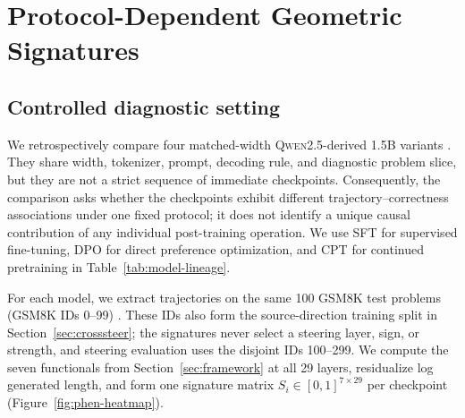 \section{Protocol-Dependent Geometric Signatures}
\label{sec:phenomenon}

\subsection{Controlled diagnostic setting}
\label{sec:phenomenon-setting}

We retrospectively compare four matched-width \textsc{Qwen2.5}-derived 1.5B variants
\citep{qwen25-2024,qwen25-math-2024,deepseek-r1-2025}.  They share width,
tokenizer, prompt, decoding rule, and diagnostic problem slice, but they are not
a strict sequence of immediate checkpoints.  Consequently, the comparison asks
whether the checkpoints exhibit different trajectory--correctness associations
under one fixed protocol; it does not identify a unique causal contribution of
any individual post-training operation.
We use SFT for supervised fine-tuning, DPO for direct preference optimization,
and CPT for continued pretraining in Table~\ref{tab:model-lineage}.

\begin{table}[tbp]
\centering
\scriptsize
\setlength{\tabcolsep}{1.5pt}
\caption{Controlled diagnostic family.  Accuracies from the shared retrospective
512-token extraction protocol describe the available correct/incorrect mix;
they are not official benchmark results and are unrelated to the corrected
steering baseline in Section~\ref{sec:crosssteer}.}
\label{tab:model-lineage}
\end{table}

For each model, we extract trajectories on the same 100 GSM8K test problems
(GSM8K IDs 0--99)
\citep{cobbe-etal-2021-training}.  These IDs also form the source-direction
training split in Section~\ref{sec:crosssteer}; the signatures never select a
steering layer, sign, or strength, and steering evaluation uses the disjoint
IDs 100--299.  We compute the seven functionals from
Section~\ref{sec:framework} at all 29 layers, residualize log generated length, and
form one signature matrix $S_i\in[0,1]^{7\times29}$ per checkpoint
(Figure~\ref{fig:phen-heatmap}).

